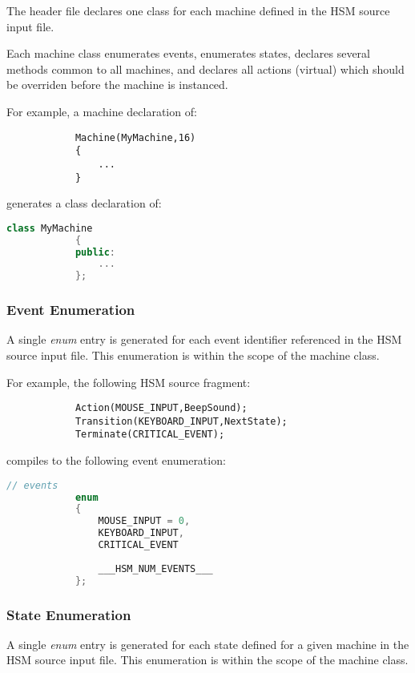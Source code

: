 \documentclass[titlepage,letterpaper]{report}
\begin{document}
The header file declares one class for each machine defined in the HSM source input
file.

Each machine class enumerates events, enumerates states, declares several methods
common to all machines, and declares all actions (virtual) which should be overriden
before the machine is instanced.

For example, a machine declaration of:

\begin{lstlisting}
			Machine(MyMachine,16)
			{
				...
			}
\end{lstlisting}

generates a class declaration of:

\begin{lstlisting}[language=C++]
			class MyMachine
			{
			public:
				...
			};
\end{lstlisting}

\subsubsection{Event Enumeration}

\label{hsmc:events}

A single \emph{enum} entry is generated for each event identifier referenced in 
the HSM source input file.  This enumeration is within the scope of the machine
class.

For example, the following HSM source fragment:

\begin{lstlisting}
			Action(MOUSE_INPUT,BeepSound);
			Transition(KEYBOARD_INPUT,NextState);
			Terminate(CRITICAL_EVENT);
\end{lstlisting}

compiles to the following event enumeration:

\begin{lstlisting}[language=C++]
			// events
			enum
			{
				MOUSE_INPUT = 0,
				KEYBOARD_INPUT,
				CRITICAL_EVENT
			
				___HSM_NUM_EVENTS___
			};
\end{lstlisting}


\subsubsection{State Enumeration}

\label{hsmc:states}

A single \emph{enum} entry is generated for each state defined for a given machine in 
the HSM source input file.  This enumeration is within the scope of the machine
class.
\end{document}
